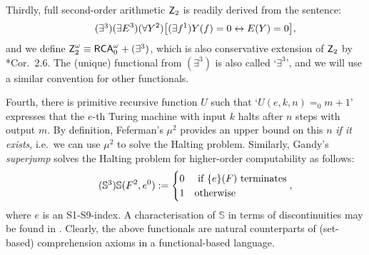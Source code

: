 \documentclass[reqno]{amsart}
\newcommand{\Z}{{\textsf{\textup{Z}}}}
\newcommand\be{\begin{equation}}
\newcommand\ee{\end{equation}}
\def\RCAo{\textup{\textsf{RCA}}_{0}^{\omega}}
\def\asa{\leftrightarrow}
\def\SJ{\mathbb{S}}
\numberwithin{equation}{section}
\numberwithin{thm}{section}
\begin{document}
\smallskip

\noindent
Thirdly, full second-order arithmetic $\Z_{2}$ is readily derived from the sentence:
\be\tag{$\exists^{3}$}
(\exists E^{3})(\forall Y^{2})\big[  (\exists f^{1})Y(f)=0\asa E(Y)=0  \big], 
\ee
and we define $\Z_{2}^{\omega}\equiv \RCAo+(\exists^{3})$, which is also conservative extension of $\Z_{2}$ by \cite{hunterphd}*{Cor.~2.6}.   The (unique) functional from $(\exists^{3})$ is also called `$\exists^{3}$', and we will use a similar convention for other functionals.  

\smallskip
\noindent
Fourth, there is primitive recursive function $U$ such that `$U(e,k,n)=_{0}m+1$' expresses that the $e$-th Turing machine with input $k$ halts after $n$ steps with output $m$.  
By definition, Feferman's $\mu^{2}$ provides an upper bound on this $n$ \emph{if it exists}, i.e.\ we can use $\mu^{2}$ to solve the Halting problem.  Similarly, Gandy's \emph{superjump} solves the Halting problem for 
higher-order computability as follows: 
\be\tag{$\SJ^{3}$}
\SJ(F^{2},e^{0}):=
\begin{cases}
0 & \textup{ if $\{e\}(F)$ terminates}\\
1 & \textup{otherwise}
\end{cases},
\ee where $e$ is an S1-S9-index.
A characterisation of $\SJ$ in terms of discontinuities may be found in \cite{hartjeS}.  %
Clearly, the above functionals are natural counterparts of (set-based) comprehension axioms in a functional-based language. 

\smallskip
\end{document}
